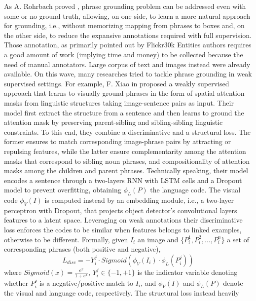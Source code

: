 As A. Rohrbach \etal{} proved \cite{rohrbach2016grounding}, phrase
grounding problem can be addressed even with some or no ground truth,
allowing, on one side, to learn a more natural approach for grounding,
i.e., without memorizing mapping from phrases to boxes and, on the
other side, to reduce the expansive annotations required with full
supervision. Those annotation, as primarily pointed out by Flickr30k
Entities authors \cite{plummer2015flickr30k} requires a good amount of
work (implying time and money) to be collected because the need of
manual annotators. Large corpus of text and images instead were
already available. On this wave, many researches tried to tackle
phrase grounding in weak supervised settings. For example, F. Xiao
\etal{} in \cite{xiao2017weakly} proposed a weakly supervised approach
that learns to visually ground phrases in the form of spatial
attention masks from linguistic structures taking image-sentence pairs
as input. Their model first extract the structure from a sentence and
then learns to ground the attention mask by preserving parent-sibling
and sibling-sibling linguistic constraints. To this end, they combine
a discriminative and a structural loss. The former ensures to match
corresponding image-phrase pairs by attracting or repulsing features,
while the latter ensure complementarity among the attention masks that
correspond to sibling noun phrases, and compositionality of attention
masks among the children and parent phrases. Technically speaking,
their model encodes a sentence through a two-layers RNN with LSTM
cells and a Dropout model to prevent overfitting, obtaining
$\phi_L(P)$ the language code. The visual code $\phi_V(I)$ is computed
instead by an embedding module, i.e., a two-layer perceptron with
Dropout, that projects object detector's convolutional layers features
to a latent space. Leveraging on weak annotations their discriminative
loss enforces the codes to be similar when features belongs to linked
examples, otherwise to be different. Formally, given $I_i$ an image
and $\{ P^1_i, P^2_i, \ldots, P^n_i \}$ a set of corresponding phrases
(both positive and negative), 
\begin{equation}
  L_{disc} = -Y^j_i \cdot Sigmoid(\phi_V(I_i) \cdot \phi_L(P^j_i))
\end{equation}
where $Sigmoid(x) = \frac{e^x}{1 + e^x}$, $Y^j_i \in \{ -1, +1 \}$ is
the indicator variable denoting whether $P^j_i$ is a negative/positive
match to $I_i$, and $\phi_V(I)$ and $\phi_L(P)$ denote the visual and
language code, respectively. The structural loss instead heavily
